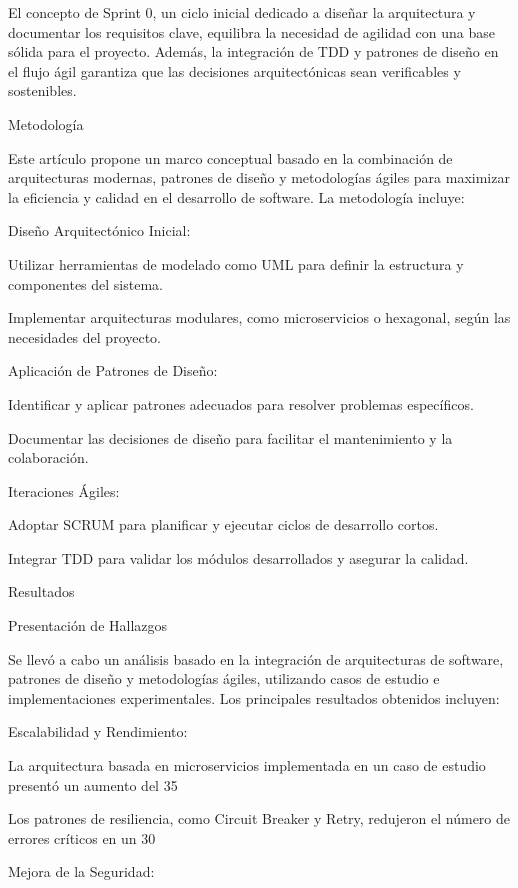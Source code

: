 \documentclass[12pt]{article}
\begin{document}
El concepto de Sprint 0, un ciclo inicial dedicado a diseñar la arquitectura y documentar los requisitos clave, equilibra la necesidad de agilidad con una base sólida para el proyecto. Además, la integración de TDD y patrones de diseño en el flujo ágil garantiza que las decisiones arquitectónicas sean verificables y sostenibles.

Metodología

Este artículo propone un marco conceptual basado en la combinación de arquitecturas modernas, patrones de diseño y metodologías ágiles para maximizar la eficiencia y calidad en el desarrollo de software. La metodología incluye:

Diseño Arquitectónico Inicial:

Utilizar herramientas de modelado como UML para definir la estructura y componentes del sistema.

Implementar arquitecturas modulares, como microservicios o hexagonal, según las necesidades del proyecto.

Aplicación de Patrones de Diseño:

Identificar y aplicar patrones adecuados para resolver problemas específicos.

Documentar las decisiones de diseño para facilitar el mantenimiento y la colaboración.

Iteraciones Ágiles:

Adoptar SCRUM para planificar y ejecutar ciclos de desarrollo cortos.

Integrar TDD para validar los módulos desarrollados y asegurar la calidad.

Resultados

Presentación de Hallazgos

Se llevó a cabo un análisis basado en la integración de arquitecturas de software, patrones de diseño y metodologías ágiles, utilizando casos de estudio e implementaciones experimentales. Los principales resultados obtenidos incluyen:

Escalabilidad y Rendimiento:

La arquitectura basada en microservicios implementada en un caso de estudio presentó un aumento del 35%

Los patrones de resiliencia, como Circuit Breaker y Retry, redujeron el número de errores críticos en un 30%

Mejora de la Seguridad:
\end{document}
